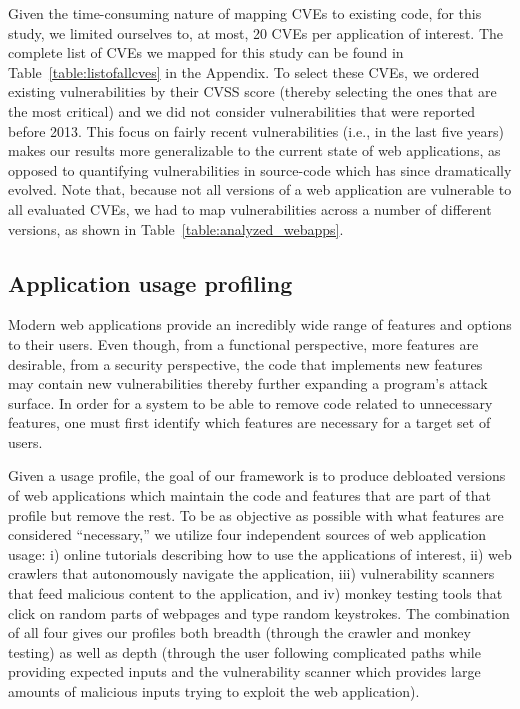 Given the time-consuming nature of mapping CVEs to existing code, for
this study, we limited ourselves to, at most, 20 CVEs per application
of interest.
The complete list of CVEs we mapped for this study can be found in
Table~\ref{table:listofallcves} in the Appendix.
To select these CVEs, we ordered existing vulnerabilities by
their CVSS score (thereby selecting the ones that are the most critical)
and we did not consider vulnerabilities that were reported before 2013. This
focus on fairly recent vulnerabilities (i.e., in the last five years) makes
our results more generalizable to the current state of web applications,
as opposed to quantifying vulnerabilities in source-code which has since
dramatically evolved. Note that, because not all versions of a web application
are vulnerable to all evaluated CVEs, we had to map vulnerabilities
across a number of different versions, as shown in
Table~\ref{table:analyzed_webapps}.



\subsection{Application usage profiling}
\label{subsec:profiling}

Modern web applications provide an incredibly wide range of features and
options to their users. Even though, from a functional perspective, more
features are desirable, from a security perspective, the code that implements
new features may contain new vulnerabilities thereby further expanding
a program's attack surface. In order for a system to be
able to remove code related to unnecessary features, one must first identify
which features are necessary for a target set of users.

Given a usage profile, the goal of our framework is to produce debloated
versions of web applications which maintain the code and features that are
part of that profile but remove the rest. To be as objective as possible with
what features are considered ``necessary,'' we utilize four independent
sources of web application usage: i) online tutorials describing how to use
the applications of interest, ii) web crawlers that autonomously navigate
the application, iii) vulnerability scanners that feed malicious content to the
application, and iv) monkey testing tools that click on random parts of webpages
and type random keystrokes. The combination of all four gives our profiles
both breadth (through the crawler and monkey testing) as well as depth (through
the user following complicated paths while providing expected inputs and the
vulnerability scanner which provides large amounts of malicious inputs trying
to exploit the web application).

